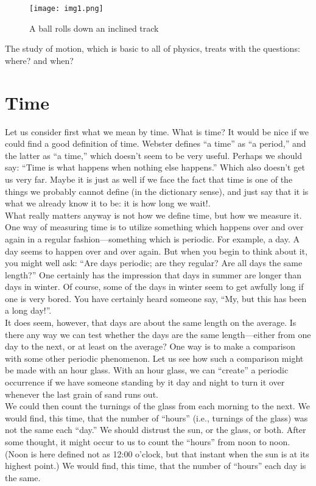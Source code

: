 \documentclass{article}
\begin{document}
	\begin{figure}[h]
	\centering
		\texttt{[image: img1.png]}
		\caption{A ball rolls down an inclined track}
		\label{Fi: Galaxia}
	\end{figure}

	The study of motion, which is basic to all of physics, treats with the questions: where? and when?

	\section{Time}


	Let us consider first what we mean by time. What is time? It would be nice if we could find a good definition of time. Webster defines “a time” as “a period,” and the latter as “a time,” which doesn’t seem to be very useful. Perhaps we should say: “Time is what happens when nothing else happens.” Which also doesn’t get us very far. Maybe it is just as well if we face the fact that time is one of the things we probably cannot define (in the dictionary sense), and just say that it is what we already know it to be: it is how long we wait!.\\

	What really matters anyway is not how we define time, but how we measure it. One way of measuring time is to utilize something which happens over and over again in a regular fashion—something which is periodic. For example, a day. A day seems to happen over and over again. But when you begin to think about it, you might well ask: “Are days periodic; are they regular? Are all days the same length?” One certainly has the impression that days in summer are longer than days in winter. Of course, some of the days in winter seem to get awfully long if one is very bored. You have certainly heard someone say, “My, but this has been a long day!”.\\

	It does seem, however, that days are about the same length on the average. Is there any way we can test whether the days are the same length—either from one day to the next, or at least on the average? One way is to make a comparison with some other periodic phenomenon. Let us see how such a comparison might be made with an hour glass. With an hour glass, we can “create” a periodic occurrence if we have someone standing by it day and night to turn it over whenever the last grain of sand runs out.\\

	We could then count the turnings of the glass from each morning to the next. We would find, this time, that the number of “hours” (i.e., turnings of the glass) was not the same each “day.” We should distrust the sun, or the glass, or both. After some thought, it might occur to us to count the “hours” from noon to noon. (Noon is here defined not as 12:00 o’clock, but that instant when the sun is at its highest point.) We would find, this time, that the number of “hours” each day is the same.\\
\end{document}
